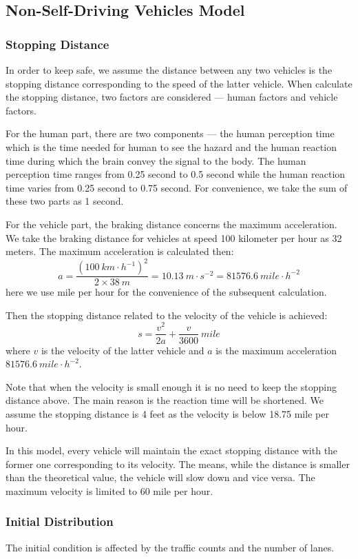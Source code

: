 \documentclass[a4paper]{article}
\begin{document}
	\subsection{Non-Self-Driving Vehicles Model}
	\subsubsection{Stopping Distance}\label{sd}
	In order to keep safe, we assume the distance between any two vehicles is the stopping distance corresponding to the speed of the latter vehicle. When calculate the stopping distance, two factors are considered — human factors and vehicle factors.


	For the human part, there are two components — the human perception time which is the time needed for human to see the hazard and the human reaction time during which the brain convey the signal to the body. The human perception time ranges from 0.25 second to 0.5 second while the human reaction time varies from 0.25 second to 0.75 second.\cite{stopping} For convenience, we take the sum of these two parts as 1 second.

	For the vehicle part, the braking distance concerns the maximum acceleration. We take the braking distance for vehicles at speed 100 kilometer per hour as 32 meters. The maximum acceleration is calculated then:
	$$ a=\dfrac{(100\ km\cdot h^{-1})^2}{2\times 38\ m}=10.13\ m\cdot s^{-2}=81576.6\ mile\cdot h^{-2} $$
	here we use mile per hour for the convenience of the subsequent calculation.

	Then the stopping distance related to the velocity of the vehicle is achieved:
	$$ s=\dfrac{v^2}{2a}+\dfrac{v}{3600}\ mile $$
	where $ v $ is the velocity of the latter vehicle and $ a $ is the maximum acceleration $ 81576.6\ mile\cdot h^{-2} $.

	Note that when the velocity is small enough it is no need to keep the stopping distance above. The main reason is the reaction time will be shortened. We assume the stopping distance is 4 feet as the velocity is below 18.75 mile per hour.

	In this model, every vehicle will maintain the exact stopping distance with the former one corresponding to its velocity. The means, while the distance is smaller than the theoretical value, the vehicle will slow down and vice versa. The maximum velocity is limited to 60 mile per hour.

	\subsubsection{Initial Distribution}
	The initial condition is affected by the traffic counts and the number of lanes.
\end{document}

